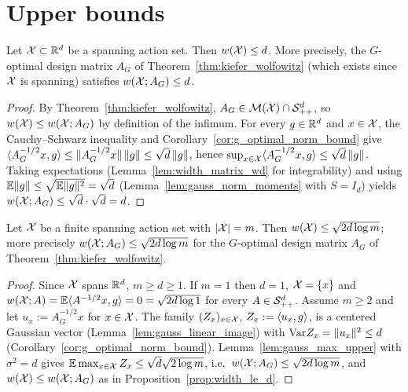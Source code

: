 \section{Upper bounds}
\label{sec:width_upper}

\begin{proposition}\label{prop:width_le_d}
\leanok
{}
Let $\mathcal{X} \subset \mathbb{R}^d$ be a spanning action set. Then $w(\mathcal{X}) \le d$. More precisely, the
$G$-optimal design matrix $A_G$ of Theorem~\ref{thm:kiefer_wolfowitz} (which exists since
$\mathcal{X}$ is spanning) satisfies $w(\mathcal{X};A_G) \le d$.
\end{proposition}

\begin{proof}
\leanok
{}
By Theorem~\ref{thm:kiefer_wolfowitz}, $A_G \in \mathcal{M}(\mathcal{X}) \cap \mathcal{S}_{++}^{d}$, so
$w(\mathcal{X}) \le w(\mathcal{X};A_G)$ by definition of the infimum. For every $g \in \mathbb{R}^d$ and
$x \in \mathcal{X}$, the Cauchy--Schwarz inequality and Corollary~\ref{cor:g_optimal_norm_bound}
give $\langle A_G^{-1/2}x, g \rangle \le \lVert A_G^{-1/2}x \rVert\,\lVert g \rVert \le \sqrt d\,\lVert g \rVert$, hence
$\sup_{x\in\mathcal{X}}\langle A_G^{-1/2}x, g \rangle \le \sqrt d\,\lVert g \rVert$. Taking expectations
(Lemma~\ref{lem:width_matrix_wd} for integrability) and using
$\mathbb{E}\lVert g \rVert \le \sqrt{\mathbb{E}\lVert g \rVert^2} = \sqrt d$ (Lemma~\ref{lem:gauss_norm_moments} with
$S = I_d$) yields $w(\mathcal{X};A_G) \le \sqrt d \cdot \sqrt d = d$.
\end{proof}

\begin{proposition}\label{prop:width_finite}
\leanok
{}
Let $\mathcal{X}$ be a finite spanning action set with $\lvert \mathcal{X} \rvert = m$. Then
$w(\mathcal{X}) \le \sqrt{2 d \log m}$; more precisely $w(\mathcal{X};A_G) \le \sqrt{2d\log m}$
for the $G$-optimal design matrix $A_G$ of Theorem~\ref{thm:kiefer_wolfowitz}.
\end{proposition}

\begin{proof}
\leanok
{}
Since $\mathcal{X}$ spans $\mathbb{R}^d$, $m \ge d \ge 1$. If $m = 1$ then $d = 1$, $\mathcal{X} = \{x\}$ and
$w(\mathcal{X};A) = \mathbb{E}\langle A^{-1/2}x, g \rangle = 0 = \sqrt{2d\log 1}$ for every $A \in \mathcal{S}_{++}^{d}$.
Assume $m \ge 2$ and let $u_x := A_G^{-1/2}x$ for $x \in \mathcal{X}$. The family
$(Z_x)_{x\in\mathcal{X}}$, $Z_x := \langle u_x, g \rangle$, is a centered Gaussian vector
(Lemma~\ref{lem:gauss_linear_image}) with $\mathrm{Var} Z_x = \lVert u_x \rVert^2 \le d$
(Corollary~\ref{cor:g_optimal_norm_bound}). Lemma~\ref{lem:gauss_max_upper} with
$\sigma^2 = d$ gives $\mathbb{E}\max_{x\in\mathcal{X}}Z_x \le \sqrt{d}\sqrt{2\log m}$, i.e.\
$w(\mathcal{X};A_G) \le \sqrt{2d\log m}$, and $w(\mathcal{X}) \le w(\mathcal{X};A_G)$ as in
Proposition~\ref{prop:width_le_d}.
\end{proof}

